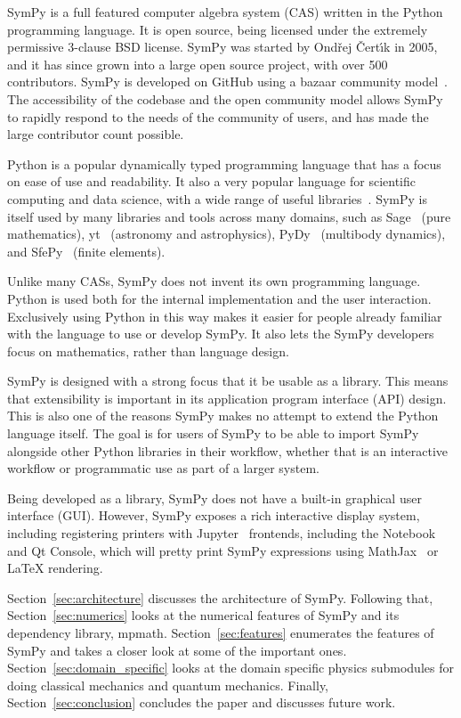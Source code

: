 SymPy is a full featured computer algebra system (CAS) written in the Python
programming language.
It is open source, being licensed under the extremely permissive 3-clause BSD
license.
SymPy was started by Ond\v{r}ej \v{C}ert\'{\i}k in 2005, and it has since
grown into a large open source project, with over 500 contributors. SymPy is
developed on GitHub using a bazaar community
model~\cite{raymond1999cathedral}. The accessibility of the codebase and the
open community model allows SymPy to rapidly respond to the needs of the
community of users, and has made the large contributor count possible.

Python is a popular dynamically typed programming language that has a focus on
ease of use and readability. It also a very popular language for scientific
computing and data science, with a wide range of useful
libraries~\cite{oliphant2007python}. SymPy is itself used by many libraries
and tools across many domains, such as Sage~\cite{SAGE} (pure mathematics),
yt~\cite{2011ApJS..192....9T} (astronomy and astrophysics),
PyDy~\cite{gede2013constrained} (multibody dynamics), and
SfePy~\cite{cimrman2014sfepy} (finite elements).

Unlike many CASs, SymPy does not invent its own programming language. Python
is used both for the internal implementation and the user interaction.
Exclusively using Python in this way makes it easier for people already
familiar with the language to use or develop SymPy. It also lets the SymPy
developers focus on mathematics, rather than language design.

SymPy is designed with a strong focus that it be usable as a library. This
means that extensibility is important in its application program interface
(API) design. This is also one of the reasons SymPy makes no attempt to extend
the Python language itself. The goal is for users of SymPy to be able to
import SymPy alongside other Python libraries in their workflow, whether that
is an interactive workflow or programmatic use as part of a larger system.

Being developed as a library, SymPy does not have a built-in graphical user
interface (GUI). However, SymPy exposes a rich interactive display system,
including registering printers with Jupyter~\cite{perez2007ipython} frontends,
including the Notebook and Qt Console, which will pretty print SymPy
expressions using MathJax~\cite{cervone2012mathjax} or \LaTeX{} rendering.

Section~\ref{sec:architecture} discusses the architecture of SymPy. Following
that, Section~\ref{sec:numerics} looks at the numerical features of SymPy and
its dependency library, mpmath. Section~\ref{sec:features} enumerates the
features of SymPy and takes a closer look at some of the important ones.
Section~\ref{sec:domain_specific} looks at the domain specific physics
submodules for doing classical mechanics and quantum mechanics. Finally,
Section~\ref{sec:conclusion} concludes the paper and discusses future work.
